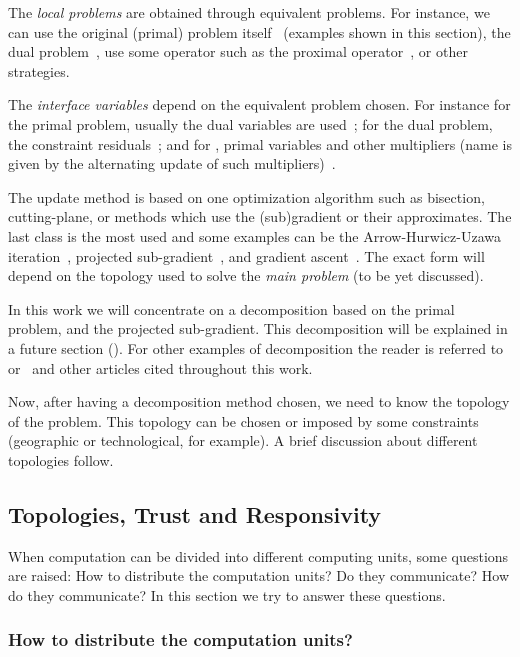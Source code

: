 \documentclass[../main.tex]{subfiles}
\begin{document}
The \emph{local problems} are obtained through equivalent problems.
For instance, we can use the original (primal) problem itself~\cite{PaulenEtAl2016, CamisaEtAl2022} (examples shown in this section), the dual problem~\cite{MorosanEtAl2011, BourdaisEtAl2012,VelardeEtAl2017},  use some operator such as the proximal operator~\cite{Iiduka2019,OconnorVandenberghe2014}, or other strategies.

The \emph{interface variables} depend on the equivalent problem chosen. For instance for the primal problem, usually the dual variables are used~\cite{Cohen1978}; for the dual problem, the constraint residuals~\cite{BoydEtAl2015}; and for \ADMM, primal variables and other multipliers (name is given by the alternating update of such multipliers)~\cite{BoydEtAl2011}.

The update method is based on one optimization algorithm such as bisection, cutting-plane, or methods which use the (sub)gradient or their approximates. The last class is the most used and some examples can be the Arrow-Hurwicz-Uzawa iteration~\cite{BourdaisEtAl2012}, projected sub-gradient~\cite{BiegelEtAl2012}, and gradient ascent~\cite{BoydEtAl2011}.
The exact form will depend on the topology used to solve the \emph{main problem} (to be yet discussed).

In this work we will concentrate on a decomposition based on the primal problem, and the projected sub-gradient.
This decomposition will be explained in a future section ().
For other examples of decomposition the reader is referred to~\cite{MaestreEtAl2014} or~\cite{ConejoEtAl2006} and other articles cited throughout this work.

Now, after having a decomposition method chosen, we need to know the topology of the problem. This topology can be chosen or imposed by some constraints (geographic or technological, for example). A brief discussion about different topologies follow.

\subsection{Topologies, Trust and Responsivity}

When computation can be divided into different computing units, some questions are raised: How to distribute the computation units? Do they communicate? How do they communicate? In this section we try to answer these questions.

\subsubsection{How to distribute the computation units?}
\end{document}

